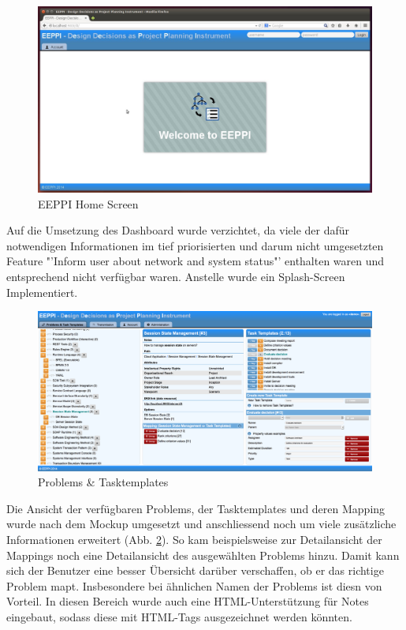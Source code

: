 		\begin{figure}[H]
			\centering
			\includegraphics[width=\linewidth]{tutorial/img/eeppiHomeScreen.jpg}
			\caption{EEPPI Home Screen}
			\label{fig:eeppiHomeScreen}
		\end{figure}	
		
		Auf die Umsetzung des Dashboard wurde verzichtet, da viele der dafür notwendigen Informationen im tief priorisierten und darum nicht umgesetzten Feature "'Inform user about network and system status"' enthalten waren und entsprechend nicht verfügbar waren.
		Anstelle wurde ein Splash-Screen Implementiert.
		
		
		\begin{figure}[H]
			\centering
			\includegraphics[width=\linewidth]{tutorial/img/eeppiDecisionsAndTaskTemplates.png}
			\caption{Problems \& Tasktemplates}
			\label{fig:eeppiDecisionsAndTaskTemplates}
		\end{figure}	
		
		Die Ansicht der verfügbaren Problems, der Tasktemplates und deren Mapping wurde nach dem Mockup umgesetzt und anschliessend noch um viele zusätzliche Informationen erweitert (Abb. \ref{fig:eeppiDecisionsAndTaskTemplates}).
		So kam beispielsweise zur Detailansicht der Mappings noch eine Detailansicht des ausgewählten Problems hinzu.
		Damit kann sich der Benutzer eine besser Übersicht darüber verschaffen,
		ob er das richtige Problem mapt.
		Insbesondere bei ähnlichen Namen der Problems ist diesn von Vorteil.
		In diesen Bereich wurde auch eine HTML-Unterstützung für Notes eingebaut, 
		sodass diese mit HTML-Tags ausgezeichnet werden könnten.
		
